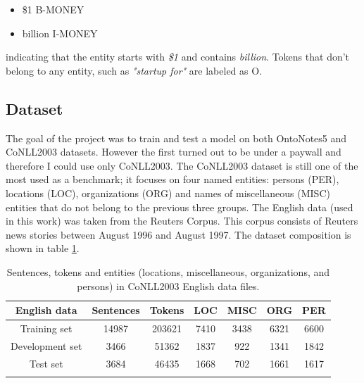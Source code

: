 \documentclass[journal]{IEEEtran}
\begin{document}
\begin{itemize}
    \item \$1 B-MONEY
    \item billion I-MONEY
\end{itemize}

\noindent indicating that the entity starts with \textit{\$1} and contains \textit{billion}. Tokens that don't belong to any entity, such as \textit{"startup for"} are labeled as O.


\subsection{Dataset}
The goal of the project was to train and test a model on both OntoNotes5 \cite{ontonotes} and CoNLL2003 \cite{conll03} datasets. However the first turned out to be under a paywall and therefore I could use only CoNLL2003.
The CoNLL2003 dataset is still one of the most used as a benchmark; it focuses on four named entities: persons (PER), locations (LOC), organizations (ORG) and names of miscellaneous (MISC) entities that do not belong to the previous three groups. The English data (used in this work) was taken from the Reuters Corpus. This corpus consists of Reuters news stories between August 1996 and August 1997. The dataset composition is shown in table \ref{tab:conll-distrib}.


\begin{table}[h]
\centering
\begin{tabular}{@{}ccccccc@{}}
\toprule
\textbf{English data} & \textbf{Sentences} & \textbf{Tokens} & \textbf{LOC} & \textbf{MISC} & \textbf{ORG} & \textbf{PER} \\ \midrule
Training set          & 14987              & 203621          & 7410         & 3438          & 6321         & 6600         \\
Development set       & 3466               & 51362           & 1837         & 922           & 1341         & 1842         \\
Test set              & 3684               & 46435           & 1668         & 702           & 1661         & 1617         \\ \bottomrule\\
\end{tabular}
\caption{Sentences, tokens and entities (locations, miscellaneous, organizations, and persons) in CoNLL2003 English data files.}
\label{tab:conll-distrib}
\end{table}
\end{document}

